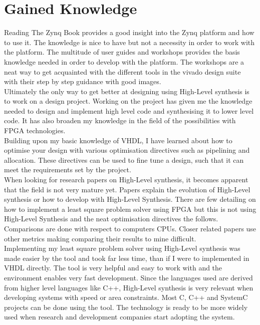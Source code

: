 \chapter{Gained Knowledge}
Reading The Zynq Book provides a good insight into the Zynq platform and how to use it. The knowledge is nice to have but not a necessity in order to work with the platform. The multitude of user guides and workshops provides the basis knowledge needed in order to develop with the platform. The workshops are a neat way to get acquainted with the different tools in the vivado design suite with their step by step guidance with good images. \\

Ultimately the only way to get better at designing using High-Level synthesis is to work on a design project. Working on the project has given me the knowledge needed to design and implement high level code and synthesising it to lower level code. It has also broaden my knowledge in the field of the possibilities with FPGA technologies. \\
Building upon my basic knowledge of VHDL, I have learned about how to optimise your design with various optimisation directives such as pipelining and allocation. These directives can be used to fine tune a design, such that it can meet the requirements set by the project. \\

When looking for research papers on High-Level synthesis, it becomes apparent that the field is not very mature yet. Papers explain the evolution of High-Level synthesis\cite{martin2009high} or how to develop with High-Level Synthesis\cite{cong2011high}. There are few detailing on how to implement a least square problem solver using FPGA\cite{yang2009fpga} but this is not using High-Level Synthesis and the neat optimisation directives the follows. Comparisons are done with respect to computers CPUs. Closer related papers use other metrics making comparing their results to mine difficult\cite{skalicky2014performance}.\\

Implementing my least square problem solver using High-Level synthesis was made easier by the tool and took far less time, than if I were to implemented in VHDL directly. The tool is very helpful and easy to work with and the environment enables very fast development. Since the languages used are derived from higher level languages like C++, High-Level synthesis is very relevant when developing systems with speed or area constraints. Most C, C++ and SystemC projects can be done using the tool. The technology is ready to be more widely used when research and development companies start adopting the system.